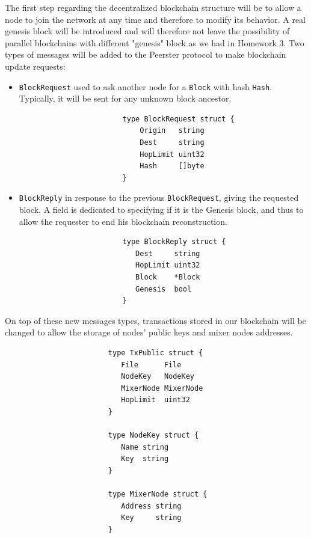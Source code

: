 \documentclass[11pt, a4paper]{article}
\begin{document}
           The first step regarding the decentralized blockchain structure will be to allow a node to join the network at any time and therefore to modify its behavior.
           A real genesis block will be introduced and will therefore not leave the possibility of parallel blockchains with different "genesis" block as we had in Homework 3.
            \bigbreak
           Two types of messages will be added to the Peerster protocol to make blockchain update requests:
           \begin{itemize}
                \item \texttt{BlockRequest} used to ask another node for a \texttt{Block} with hash \texttt{Hash}. Typically, it will be sent for any unknown block ancestor.
                    \begin{lstlisting}
                        type BlockRequest struct {
                            Origin   string
                            Dest     string
                            HopLimit uint32
                            Hash     []byte
                        }
                    \end{lstlisting}

               \item \texttt{BlockReply} in response to the previous \texttt{BlockRequest}, giving the requested block.
               A field is dedicated to specifying if it is the Genesis block, and thus to allow the requester to end his blockchain reconstruction.
                    \begin{lstlisting}
                        type BlockReply struct {
                           Dest     string
                           HopLimit uint32
                           Block    *Block
                           Genesis  bool
                        }
                    \end{lstlisting}
           \end{itemize}

            On top of these new messages types, transactions stored in our blockchain will be changed to allow the storage of nodes' public keys and mixer nodes addresses.
                \begin{lstlisting}
                        type TxPublic struct {
                           File      File
                           NodeKey   NodeKey
                           MixerNode MixerNode
                           HopLimit  uint32
                        }

                        type NodeKey struct {
                           Name string
                           Key  string
                        }

                        type MixerNode struct {
                           Address string
                           Key     string
                        }
                \end{lstlisting}
\end{document}
